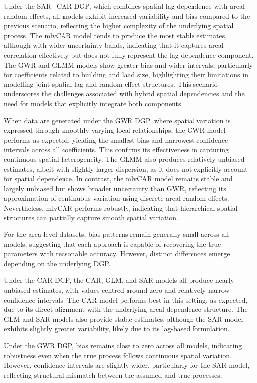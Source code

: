 \documentclass[a4paper,reqno]{amsart}
\begin{document}
Under the SAR+CAR DGP, which combines spatial lag dependence with areal
random effects, all models exhibit increased variability and bias
compared to the previous scenario, reflecting the higher complexity of
the underlying spatial process. The mlvCAR model tends to produce the
most stable estimates, although with wider uncertainty bands, indicating
that it captures areal correlation effectively but does not fully
represent the lag dependence component. The GWR and GLMM models show
greater bias and wider intervals, particularly for coefficients related
to building and land size, highlighting their limitations in modelling
joint spatial lag and random-effect structures. This scenario
underscores the challenges associated with hybrid spatial dependencies
and the need for models that explicitly integrate both components.

When data are generated under the GWR DGP, where spatial variation is
expressed through smoothly varying local relationships, the GWR model
performs as expected, yielding the smallest bias and narrowest
confidence intervals across all coefficients. This confirms its
effectiveness in capturing continuous spatial heterogeneity. The GLMM
also produces relatively unbiased estimates, albeit with slightly larger
dispersion, as it does not explicitly account for spatial dependence. In
contrast, the mlvCAR model remains stable and largely unbiased but shows
broader uncertainty than GWR, reflecting its approximation of continuous
variation using discrete areal random effects. Nevertheless, mlvCAR
performs robustly, indicating that hierarchical spatial structures can
partially capture smooth spatial variation.

For the area-level datasets, bias patterns remain generally small across
all models, suggesting that each approach is capable of recovering the
true parameters with reasonable accuracy. However, distinct differences
emerge depending on the underlying DGP.

Under the CAR DGP, the CAR, GLM, and SAR models all produce nearly
unbiased estimates, with values centred around zero and relatively
narrow confidence intervals. The CAR model performs best in this
setting, as expected, due to its direct alignment with the underlying
areal dependence structure. The GLM and SAR models also provide stable
estimates, although the SAR model exhibits slightly greater variability,
likely due to its lag-based formulation.

Under the GWR DGP, bias remains close to zero across all models,
indicating robustness even when the true process follows continuous
spatial variation. However, confidence intervals are slightly wider,
particularly for the SAR model, reflecting structural mismatch between
the assumed and true processes.
\end{document}

